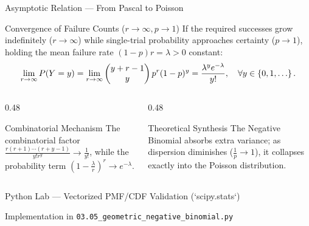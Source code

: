 \documentclass[aspectratio=169,xcolor={dvipsnames,table}]{beamer}
\begin{document}
\begin{frame}{Asymptotic Relation --- From Pascal to Poisson}
	\begin{block}{Convergence of Failure Counts ($r \to \infty, p \to 1$)}
		\small
		If the required successes grow indefinitely ($r \to \infty$) while single-trial probability approaches certainty ($p \to 1$), holding the mean failure rate $(1-p)r = \lambda > 0$ constant:
		\begin{align*}
			\lim_{r \to \infty} P(Y = y) = \lim_{r \to \infty} \comb{y+r-1}{y} p^r (1-p)^y = \dfrac{\lambda^y e^{-\lambda}}{y!}, \quad \forall y \in \set{0, 1, \dots}.
		\end{align*}
	\end{block}
	\vspace{-0.15cm}
	\begin{columns}[T]
		\begin{column}{0.48\textwidth}
			\begin{exampleblock}{Combinatorial Mechanism}
				\footnotesize
				The combinatorial factor $\frac{r(r+1)\cdots(r+y-1)}{y! r^y} \to \frac{1}{y!}$, while the probability term $\left(1 - \frac{\lambda}{r}\right)^r \to e^{-\lambda}$.
			\end{exampleblock}
		\end{column}
		\begin{column}{0.48\textwidth}
			\begin{alertblock}{Theoretical Synthesis}
				\footnotesize
				The Negative Binomial absorbs extra variance; as dispersion diminishes ($\frac{1}{p} \to 1$), it collapses exactly into the Poisson distribution.
			\end{alertblock}
		\end{column}
	\end{columns}
\end{frame}









\begin{frame}[fragile]{Python Lab --- Vectorized PMF/CDF Validation (`scipy.stats`)}
	\vspace{-0.15cm}
	\begin{block}{Implementation in \texttt{03.05\_geometric\_negative\_binomial.py}}
		
	\end{block}
\end{frame}
\end{document}
